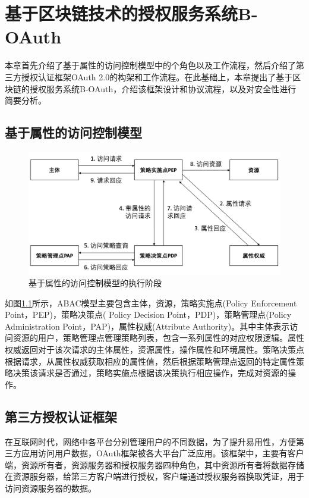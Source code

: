 
\chapter{基于区块链技术的授权服务系统B-OAuth}
\label{chap:b-oauth}

本章首先介绍了基于属性的访问控制模型中的个角色以及工作流程，然后介绍了第三方授权认证框架OAuth 2.0的构架和工作流程。在此基础上，本章提出了基于区块链的授权服务系统B-OAuth，介绍该框架设计和协议流程，以及对安全性进行简要分析。

\section{基于属性的访问控制模型}

\begin{figure}[H]
\centering
\includegraphics[width=12cm, keepaspectratio]{figures/abac.png}
\caption{基于属性的访问控制模型的执行阶段}
\label{fig:abac}
\end{figure}

如图\ref{fig:abac}所示，ABAC模型主要包含主体，资源，策略实施点(Policy Enforcement Point，PEP)，策略决策点( Policy Decision Point，PDP)，策略管理点(Policy Administration Point，PAP)，属性权威(Attribute Authority)。其中主体表示访问资源的用户，策略管理点管理策略列表，包含一系列属性的对应权限逻辑。属性权威返回对于该次请求的主体属性，资源属性，操作属性和环境属性。策略决策点根据请求，从属性权威获取相应的属性值，然后根据策略管理点返回的特定属性策略决策该请求是否通过，策略实施点根据该决策执行相应操作，完成对资源的操作。

\section{第三方授权认证框架}

在互联网时代，网络中各平台分别管理用户的不同数据，为了提升易用性，方便第三方应用访问用户数据，OAuth框架被各大平台广泛应用。该框架中，主要有客户端，资源所有者，资源服务器和授权服务器四种角色，其中资源所有者将数据存储在资源服务器，给第三方客户端进行授权，客户端通过授权服务器换取凭证，用于访问资源服务器的数据。


